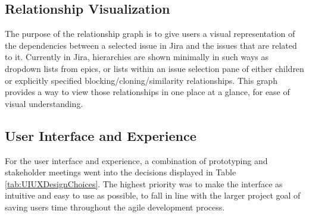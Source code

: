 \subsection{Relationship Visualization}
The purpose of the relationship graph is to give users a visual representation of the dependencies between a selected issue in Jira and the issues that are related to it. Currently in Jira, hierarchies are shown minimally in such ways as dropdown lists from epics, or lists within an issue selection pane of either children or explicitly specified blocking/cloning/similarity relationships. This graph provides a way to view those relationships in one place at a glance, for ease of visual understanding.

\subsection{User Interface and Experience}
For the user interface and experience, a combination of prototyping and stakeholder meetings went into the decisions displayed in Table \ref{tab:UIUXDesignChoices}. The highest priority was to make the interface as intuitive and easy to use as possible, to fall in line with the larger project goal of saving users time throughout the agile development process.
